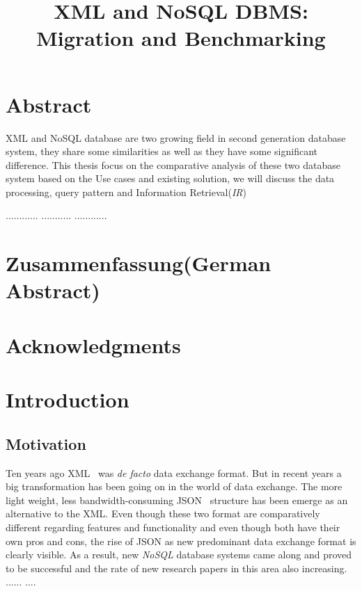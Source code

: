 \documentclass[a4paper,12pt]{article}
\title{XML and NoSQL DBMS: Migration and Benchmarking}
\subtitle{
}
\begin{document}
	
	\renewcommand{\lstlistingname}{Code} 
	
	
	\maketitle
	\thispagestyle{empty}
	
	\newpage
	\section*{Abstract}
		XML and NoSQL database are two growing field in second generation database system, they share some similarities as well as they have some significant difference. 
		This thesis focus on the  comparative analysis of these two database system based on the Use cases and existing solution, we will discuss the data processing, query pattern and  Information Retrieval(\textit{IR})
		
		............
		...........
		............
	
	\section*{Zusammenfassung(German Abstract)}
	
	\section*{Acknowledgments}
	
	\thispagestyle{empty}
	\newpage
	\tableofcontents
	\thispagestyle{empty}
	\newpage
	\section{Introduction}
	\setcounter{page}{1}
	\subsection{Motivation}
		\label{motivation}
			Ten years ago XML~\cite{www/xml} was  \textit{de facto} data exchange format. But in recent years a big transformation has been going on in the world of data exchange. The more light weight, less bandwidth-consuming JSON~\cite{www/json} structure has been emerge as an alternative to the XML. Even though these two format are comparatively different regarding features and functionality  and even though both have their own pros and cons, the rise of JSON as new predominant data exchange format is clearly visible. As a result, new  \textit{NoSQL} database systems came along and proved to be successful and the rate of new research papers in this area also increasing.
			......
			....
	
\end{document}
